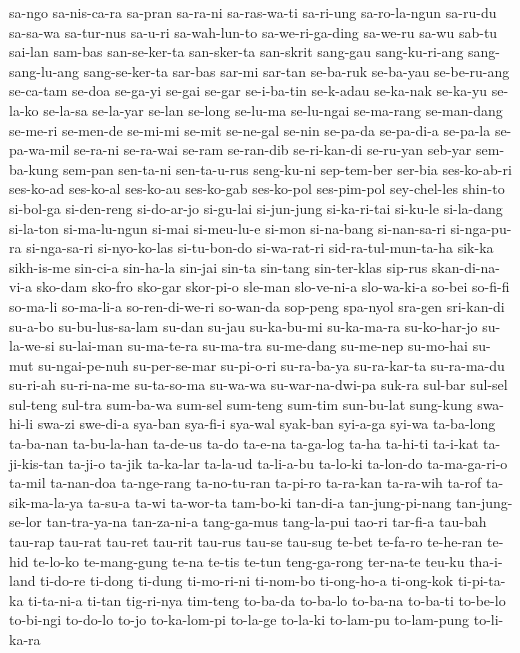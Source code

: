 {sa-ngo sa-nis-ca-ra sa-pran sa-ra-ni sa-ras-wa-ti sa-ri-ung sa-ro-la-ngun
sa-ru-du sa-sa-wa sa-tur-nus sa-u-ri sa-wah-lun-to sa-we-ri-ga-ding
sa-we-ru sa-wu sab-tu sai-lan sam-bas san-se-ker-ta san-sker-ta san-skrit
sang-gau sang-ku-ri-ang sang-sang-lu-ang sang-se-ker-ta sar-bas sar-mi
sar-tan se-ba-ruk se-ba-yau se-be-ru-ang se-ca-tam se-doa se-ga-yi se-gai
se-gar se-i-ba-tin se-k-adau se-ka-nak se-ka-yu se-la-ko se-la-sa
se-la-yar se-lan se-long se-lu-ma se-lu-ngai se-ma-rang se-man-dang
se-me-ri se-men-de se-mi-mi se-mit se-ne-gal se-nin se-pa-da se-pa-di-a
se-pa-la se-pa-wa-mil se-ra-ni se-ra-wai se-ram se-ran-dib se-ri-kan-di
se-ru-yan seb-yar sem-ba-kung sem-pan sen-ta-ni sen-ta-u-rus seng-ku-ni
sep-tem-ber ser-bia ses-ko-ab-ri ses-ko-ad ses-ko-al ses-ko-au ses-ko-gab
ses-ko-pol ses-pim-pol sey-chel-les shin-to si-bol-ga si-den-reng
si-do-ar-jo si-gu-lai si-jun-jung si-ka-ri-tai si-ku-le si-la-dang
si-la-ton si-ma-lu-ngun si-mai si-meu-lu-e si-mon si-na-bang si-nan-sa-ri
si-nga-pu-ra si-nga-sa-ri si-nyo-ko-las si-tu-bon-do si-wa-rat-ri
sid-ra-tul-mun-ta-ha sik-ka sikh-is-me sin-ci-a sin-ha-la sin-jai sin-ta
sin-tang sin-ter-klas sip-rus skan-di-na-vi-a sko-dam sko-fro sko-gar
skor-pi-o sle-man slo-ve-ni-a slo-wa-ki-a so-bei so-fi-fi so-ma-li
so-ma-li-a so-ren-di-we-ri so-wan-da sop-peng spa-nyol sra-gen sri-kan-di
su-a-bo su-bu-lus-sa-lam su-dan su-jau su-ka-bu-mi su-ka-ma-ra
su-ko-har-jo su-la-we-si su-lai-man su-ma-te-ra su-ma-tra su-me-dang
su-me-nep su-mo-hai su-mut su-ngai-pe-nuh su-per-se-mar su-pi-o-ri
su-ra-ba-ya su-ra-kar-ta su-ra-ma-du su-ri-ah su-ri-na-me su-ta-so-ma
su-wa-wa su-war-na-dwi-pa suk-ra sul-bar sul-sel sul-teng sul-tra
sum-ba-wa sum-sel sum-teng sum-tim sun-bu-lat sung-kung swa-hi-li swa-zi
swe-di-a sya-ban sya-fi-i sya-wal syak-ban syi-a-ga syi-wa ta-ba-long
ta-ba-nan ta-bu-la-han ta-de-us ta-do ta-e-na ta-ga-log ta-ha ta-hi-ti
ta-i-kat ta-ji-kis-tan ta-ji-o ta-jik ta-ka-lar ta-la-ud ta-li-a-bu
ta-lo-ki ta-lon-do ta-ma-ga-ri-o ta-mil ta-nan-doa ta-nge-rang
ta-no-tu-ran ta-pi-ro ta-ra-kan ta-ra-wih ta-rof ta-sik-ma-la-ya ta-su-a
ta-wi ta-wor-ta tam-bo-ki tan-di-a tan-jung-pi-nang tan-jung-se-lor
tan-tra-ya-na tan-za-ni-a tang-ga-mus tang-la-pui tao-ri tar-fi-a tau-bah
tau-rap tau-rat tau-ret tau-rit tau-rus tau-se tau-sug te-bet te-fa-ro
te-he-ran te-hid te-lo-ko te-mang-gung te-na te-tis te-tun teng-ga-rong
ter-na-te teu-ku tha-i-land ti-do-re ti-dong ti-dung ti-mo-ri-ni ti-nom-bo
ti-ong-ho-a ti-ong-kok ti-pi-ta-ka ti-ta-ni-a ti-tan tig-ri-nya tim-teng
to-ba-da to-ba-lo to-ba-na to-ba-ti to-be-lo to-bi-ngi to-do-lo to-jo
to-ka-lom-pi to-la-ge to-la-ki to-lam-pu to-lam-pung to-li-ka-ra
}
